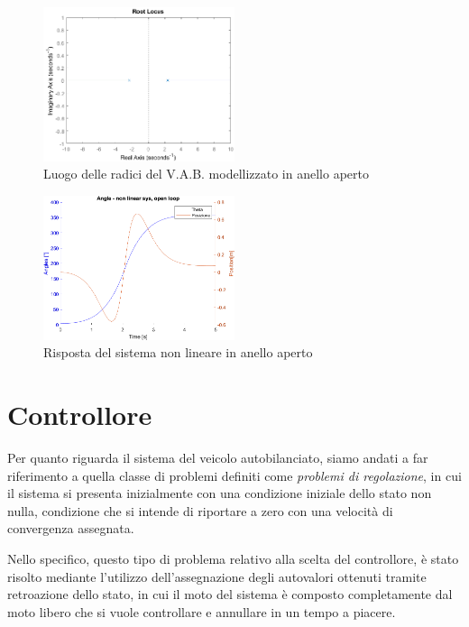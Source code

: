 \begin{figure}[H]
	\centering   	
	\includegraphics[width=0.5\textwidth]{Immagini/root_locus_open_loop.png}
	\caption{Luogo delle radici del V.A.B. modellizzato in anello aperto}
	\label{fig:r_locus_openloop}
\end{figure}

\begin{figure}[H]
	\centering   	
	\includegraphics[width=0.5\textwidth]{Immagini/open_loop_response_non_linear.png}
	\caption{Risposta del sistema non lineare in anello aperto}
	\label{fig:openloop_nonlin_response}
\end{figure}

\section{Controllore}
Per quanto riguarda il sistema del veicolo autobilanciato, siamo andati a far riferimento a quella classe di problemi definiti come \textit{problemi di regolazione}, in cui il sistema si presenta inizialmente con una condizione iniziale dello stato non nulla, condizione che si intende di riportare a zero con una velocità di convergenza assegnata.

Nello specifico, questo tipo di problema relativo alla scelta del controllore, è stato risolto mediante l'utilizzo dell'assegnazione degli autovalori ottenuti tramite retroazione dello stato, in cui il moto del sistema è composto completamente dal moto libero che si vuole controllare e annullare in un tempo a piacere.

